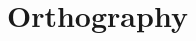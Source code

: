 \documentclass[12pt]{book} %
\begin{document}
%
%
%
%
%
%



\section{Orthography}\label{sec:orthography}
\end{document}

